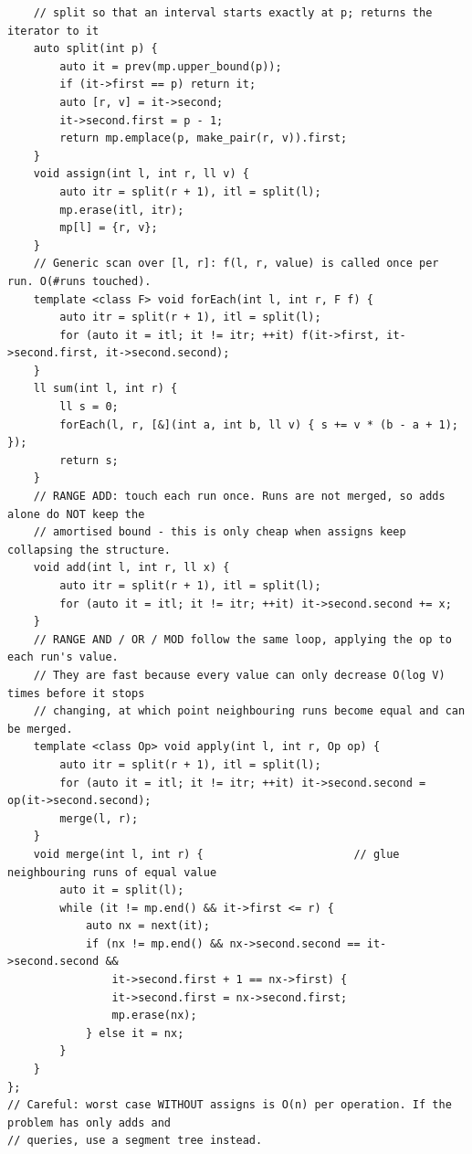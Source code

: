 \documentclass[9pt,a4paper,twocolumn]{extarticle}
\begin{document}
\begin{lstlisting}
    // split so that an interval starts exactly at p; returns the iterator to it
    auto split(int p) {
        auto it = prev(mp.upper_bound(p));
        if (it->first == p) return it;
        auto [r, v] = it->second;
        it->second.first = p - 1;
        return mp.emplace(p, make_pair(r, v)).first;
    }
    void assign(int l, int r, ll v) {
        auto itr = split(r + 1), itl = split(l);
        mp.erase(itl, itr);
        mp[l] = {r, v};
    }
    // Generic scan over [l, r]: f(l, r, value) is called once per run. O(#runs touched).
    template <class F> void forEach(int l, int r, F f) {
        auto itr = split(r + 1), itl = split(l);
        for (auto it = itl; it != itr; ++it) f(it->first, it->second.first, it->second.second);
    }
    ll sum(int l, int r) {
        ll s = 0;
        forEach(l, r, [&](int a, int b, ll v) { s += v * (b - a + 1); });
        return s;
    }
    // RANGE ADD: touch each run once. Runs are not merged, so adds alone do NOT keep the
    // amortised bound - this is only cheap when assigns keep collapsing the structure.
    void add(int l, int r, ll x) {
        auto itr = split(r + 1), itl = split(l);
        for (auto it = itl; it != itr; ++it) it->second.second += x;
    }
    // RANGE AND / OR / MOD follow the same loop, applying the op to each run's value.
    // They are fast because every value can only decrease O(log V) times before it stops
    // changing, at which point neighbouring runs become equal and can be merged.
    template <class Op> void apply(int l, int r, Op op) {
        auto itr = split(r + 1), itl = split(l);
        for (auto it = itl; it != itr; ++it) it->second.second = op(it->second.second);
        merge(l, r);
    }
    void merge(int l, int r) {                       // glue neighbouring runs of equal value
        auto it = split(l);
        while (it != mp.end() && it->first <= r) {
            auto nx = next(it);
            if (nx != mp.end() && nx->second.second == it->second.second &&
                it->second.first + 1 == nx->first) {
                it->second.first = nx->second.first;
                mp.erase(nx);
            } else it = nx;
        }
    }
};
// Careful: worst case WITHOUT assigns is O(n) per operation. If the problem has only adds and
// queries, use a segment tree instead.
\end{lstlisting}

\filbreak
\end{document}
